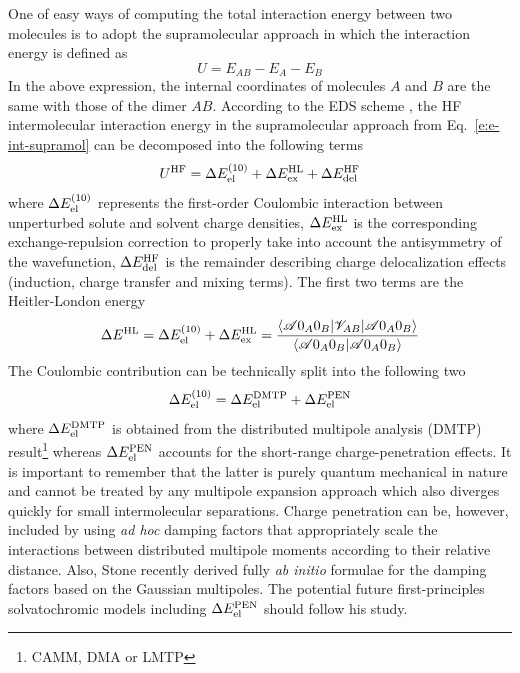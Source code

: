 \documentclass[a4paper,titlepage,twoside,fleqn,12pt]{book}
\begin{document}
\begin{refsection}
One of easy ways of computing the total interaction energy
between two molecules is to adopt the supramolecular approach
in which the interaction energy is defined as
%
\begin{equation} \label{e:e-int-supramol}
 U = E_{AB} - E_A - E_B
\end{equation}
%
In the above expression, the internal coordinates of molecules $A$ and $B$
are the same with those of the dimer $AB$.
According to the EDS scheme \citep{Sokalski.Roszak.Pecul.CPL.1988,
Chalasinski.Szczesniak.MolPhys.1988,Cybulski.Chalasinski.Moszynski.JCP.1990,
Gora.Bartkowiak.Roszak.Leszczynski.JCP.2004}, the HF
intermolecular interaction energy in the supramolecular
approach from Eq.~\eqref{e:e-int-supramol} can be decomposed
into the following terms
%
\begin{equation}
 U^{\rm HF} = \Delta E_{\rm el}^{(10)}    + 
              \Delta E_{\rm ex}^{\rm HL}  +
              \Delta E_{\rm del}^{\rm HF}
\end{equation}
%
where $\Delta E_{\rm el}^{(10)}$ represents the first\hyp{}order 
Coulombic interaction
between unperturbed solute and solvent charge densities, 
$\Delta E_{\rm ex}^{\rm HL}$ is the corresponding exchange\hyp{}repulsion
correction to properly take into account the antisymmetry of the wavefunction,
$\Delta E_{\rm del}^{\rm HF}$ is the remainder describing charge delocalization
effects (induction, charge transfer and mixing terms). The first two terms
are the Heitler\hyp{}London energy
%
\begin{equation}
 \Delta E^{\rm HL} = \Delta E_{\rm el}^{(10)}    + 
                     \Delta E_{\rm ex}^{\rm HL}
  = \frac{
\langle \mathscr{A} 0_A0_B \lvert \mathscr{V}_{AB} \rvert \mathscr{A} 0_A0_B \rangle 
}{
\langle \mathscr{A} 0_A0_B \vert \mathscr{A} 0_A0_B \rangle 
}
\end{equation}
%
The Coulombic contribution can be technically split into the following
two
%
\begin{equation}
 \Delta E_{\rm el}^{(10)} = \Delta E_{\rm el}^{\rm DMTP} + \Delta E_{\rm el}^{\rm PEN}
\end{equation}
%
where $\Delta E_{\rm el}^{\rm DMTP}$ is obtained from the distributed multipole 
analysis (DMTP) result\footnote{CAMM, DMA or LMTP} whereas
$\Delta E_{\rm el}^{\rm PEN}$ accounts for the short\hyp{}range charge\hyp{}penetration
effects. It is important to remember that the latter is purely quantum mechanical in
nature and cannot be treated by any multipole expansion approach which also diverges
quickly for small intermolecular separations.
Charge penetration can be, however, included by using \emph{ad hoc} damping factors
that appropriately scale the interactions between distributed multipole
moments according to their relative distance.\citep{Slipchenko.Gordon.JCC.2007,Wang.Truhlar.JCTC.2010}
Also, Stone recently derived fully \emph{ab initio} formulae
for the damping factors based on the Gaussian multipoles.\citep{Stone.JPCA.2011}
The potential future
first\hyp{}principles solvatochromic
models including $\Delta E_{\rm el}^{\rm PEN}$ should follow his study.


\end{refsection}
\end{document}
